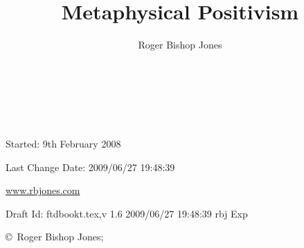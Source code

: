 \documentclass[10pt,titlepage]{article}
\author{Roger Bishop Jones}
\title{Metaphysical Positivism}
\date{\ }
\begin{document}
\begin{titlepage}
\maketitle

\ 
\\

\vfill

\begin{centering}

{\footnotesize

Started: 9th February 2008

Last Change $ $Date: 2009/06/27 19:48:39 $ $

\href{http://www.rbjones.com/}{www.rbjones.com}

Draft $ $Id: ftdbookt.tex,v 1.6 2009/06/27 19:48:39 rbj Exp $ $

\copyright\ Roger Bishop Jones;

}%

\end{centering}

\thispagestyle{empty}
\end{titlepage}

{\parskip=0pt\tableofcontents}
\end{document}
